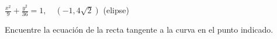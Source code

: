 \item $\displaystyle \frac{x^2}{9} + \frac{y^2}{36} = 1, \quad (-1, 4\sqrt{2})$ \quad (elipse)
\par
Encuentre la ecuación de la recta tangente a la curva en el punto indicado.
